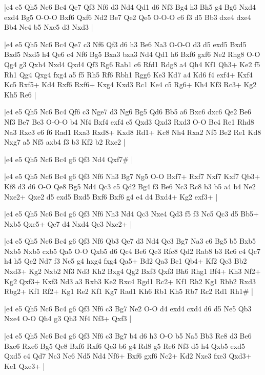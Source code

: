 \whitename{}
\blackname{}
\makegametitle
|e4 e5 Qh5 Nc6 Bc4 Qe7 Qf3 Nf6 d3 Nd4 Qd1 d6 Nf3 Bg4 h3 Bh5 g4 Bg6 Nxd4 exd4 Bg5 O-O-O Bxf6 Qxf6 Nd2 Be7 Qe2 Qe5 O-O-O c6 f3 d5 Bb3 dxe4 dxe4 Bb4 Nc4 b5 Nxe5 d3 Nxd3  |

\whitename{}
\blackname{}
\makegametitle
|e4 e5 Qh5 Nc6 Bc4 Qe7 c3 Nf6 Qf3 d6 h3 Be6 Na3 O-O-O d3 d5 exd5 Bxd5 Bxd5 Nxd5 h4 Qe6 c4 Nf6 Bg5 Bxa3 bxa3 Nd4 Qd1 h6 Bxf6 gxf6 Ne2 Rhg8 O-O Qg4 g3 Qxh4 Nxd4 Qxd4 Qf3 Rg6 Rab1 c6 Rfd1 Rdg8 a4 Qh4 Kf1 Qh3+ Ke2 f5 Rh1 Qg4 Qxg4 fxg4 a5 f5 Rh5 Rf6 Rbh1 Rgg6 Ke3 Kd7 a4 Kd6 f4 exf4+ Kxf4 Kc5 Rxf5+ Kd4 Rxf6 Rxf6+ Kxg4 Kxd3 Rc1 Ke4 c5 Rg6+ Kh4 Kf3 Rc3+ Kg2 Kh5 Re6  |

\whitename{}
\blackname{}
\makegametitle
|e4 e5 Qh5 Nc6 Bc4 Qf6 c3 Nge7 d3 Ng6 Bg5 Qd6 Bb5 a6 Bxc6 dxc6 Qe2 Be6 Nf3 Be7 Be3 O-O-O b4 Nf4 Bxf4 exf4 e5 Qxd3 Qxd3 Rxd3 O-O Bc4 Re1 Rhd8 Na3 Rxc3 e6 f6 Rad1 Rxa3 Rxd8+ Kxd8 Rd1+ Kc8 Nh4 Rxa2 Nf5 Be2 Re1 Kd8 Nxg7 a5 Nf5 axb4 f3 b3 Kf2 b2 Rxe2  |

\whitename{}
\blackname{}
\makegametitle
|e4 e5 Qh5 Nc6 Bc4 g6 Qf3 Nd4 Qxf7\#  |

\whitename{}
\blackname{}
\makegametitle
|e4 e5 Qh5 Nc6 Bc4 g6 Qf3 Nf6 Nh3 Bg7 Ng5 O-O Bxf7+ Rxf7 Nxf7 Kxf7 Qb3+ Kf8 d3 d6 O-O Qe8 Bg5 Nd4 Qc3 c5 Qd2 Bg4 f3 Be6 Nc3 Rc8 b3 b5 a4 b4 Ne2 Nxe2+ Qxe2 d5 exd5 Bxd5 Bxf6 Bxf6 g4 e4 d4 Bxd4+ Kg2 exf3+  |

\whitename{}
\blackname{}
\makegametitle
|e4 e5 Qh5 Nc6 Bc4 g6 Qf3 Nf6 Nh3 Nd4 Qc3 Nxe4 Qd3 f5 f3 Nc5 Qc3 d5 Bb5+ Nxb5 Qxe5+ Qe7 d4 Nxd4 Qe3 Nxc2+  |

\whitename{}
\blackname{}
\makegametitle
|e4 e5 Qh5 Nc6 Bc4 g6 Qf3 Nf6 Qb3 Qe7 d3 Nd4 Qc3 Bg7 Na3 c6 Bg5 b5 Bxb5 Nxb5 Nxb5 cxb5 Qa5 O-O Qxb5 d6 Qc4 Be6 Qc3 Rfc8 Qd2 Rab8 b3 Rc6 c4 Qc7 h4 h5 Qe2 Nd7 f3 Nc5 g4 hxg4 fxg4 Qa5+ Bd2 Qa3 Bc1 Qb4+ Kf2 Qc3 Bb2 Nxd3+ Kg2 Nxb2 Nf3 Nd3 Kh2 Bxg4 Qg2 Bxf3 Qxf3 Bh6 Rhg1 Bf4+ Kh3 Nf2+ Kg2 Qxf3+ Kxf3 Nd3 a3 Rxb3 Ke2 Rxc4 Rgd1 Rc2+ Kf1 Rh2 Kg1 Rbb2 Rxd3 Rbg2+ Kf1 Rf2+ Kg1 Re2 Kf1 Kg7 Rad1 Kh6 Rb1 Kh5 Rb7 Rc2 Rd1 Rh1\#  |

\whitename{}
\blackname{}
\makegametitle
|e4 e5 Qh5 Nc6 Bc4 g6 Qf3 Nf6 c3 Bg7 Ne2 O-O d4 exd4 cxd4 d6 d5 Ne5 Qb3 Nxe4 O-O Qh4 g3 Qh3 Nf4 Nf3+ Qxf3  |

\whitename{}
\blackname{}
\makegametitle
|e4 e5 Qh5 Nc6 Bc4 g6 Qf3 Nf6 c3 Bg7 b4 d6 h3 O-O b5 Na5 Bb3 Re8 d3 Be6 Bxe6 Rxe6 Bg5 Qe8 Bxf6 Rxf6 Qe3 b6 g4 Rd8 g5 Re6 Nf3 d5 h4 Qxb5 exd5 Qxd5 c4 Qd7 Nc3 Nc6 Nd5 Nd4 Nf6+ Bxf6 gxf6 Nc2+ Kd2 Nxe3 fxe3 Qxd3+ Ke1 Qxe3+  |

